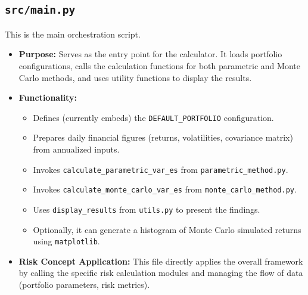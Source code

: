 \documentclass[11pt,a4paper]{article}
\begin{document}
\subsection{\texttt{src/main.py}}
This is the main orchestration script.
\begin{itemize}
    \item \textbf{Purpose:} Serves as the entry point for the calculator. It loads portfolio configurations, calls the calculation functions for both parametric and Monte Carlo methods, and uses utility functions to display the results.
    \item \textbf{Functionality:}
        \begin{itemize}
            \item Defines (currently embeds) the \texttt{DEFAULT\_PORTFOLIO} configuration.
            \item Prepares daily financial figures (returns, volatilities, covariance matrix) from annualized inputs.
            \item Invokes \texttt{calculate\_parametric\_var\_es} from \texttt{parametric\_method.py}.
            \item Invokes \texttt{calculate\_monte\_carlo\_var\_es} from \texttt{monte\_carlo\_method.py}.
            \item Uses \texttt{display\_results} from \texttt{utils.py} to present the findings.
            \item Optionally, it can generate a histogram of Monte Carlo simulated returns using \texttt{matplotlib}.
        \end{itemize}
    \item \textbf{Risk Concept Application:} This file directly applies the overall framework by calling the specific risk calculation modules and managing the flow of data (portfolio parameters, risk metrics).
\end{itemize}
\end{document}
